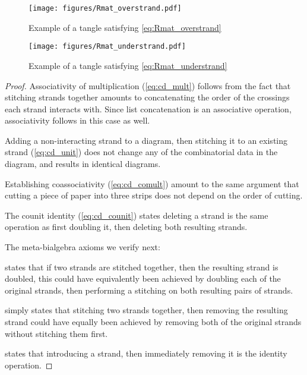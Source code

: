 \begin{figure}[h]
        \centering
        \texttt{[image: figures/Rmat\_overstrand.pdf]}
        \caption{Example of a tangle satisfying \cref{eq:Rmat_overstrand}}
        \label{fig:Rmat_overstrand}
\end{figure}
\begin{figure}[h]
        \centering
        \texttt{[image: figures/Rmat\_understrand.pdf]}
        \caption{Example of a tangle satisfying \cref{eq:Rmat_understrand}}
        \label{fig:Rmat_understrand}
\end{figure}
\begin{proof}
        Associativity of multiplication (\cref{eq:cd_mult}) follows from the
        fact that stitching strands together amounts to concatenating the order
        of the crossings each strand interacts with. Since list concatenation is
        an associative operation, associativity follows in this case as well.

        Adding a non-interacting strand to a diagram, then stitching it to an
        existing strand (\cref{eq:cd_unit}) does not change any of the
        combinatorial data in the diagram, and results in identical diagrams.

        Establishing coassociativity (\cref{eq:cd_comult}) amount to the same
        argument that cutting a piece of paper into three strips does not depend
        on the order of cutting.

        The counit identity (\cref{eq:cd_counit}) states deleting a strand
        is the same operation as first doubling it, then deleting both resulting
        strands.

        The meta-bialgebra axioms we verify next:

         states that if two strands are stitched
        together, then the resulting strand is doubled, this could have
        equivalently been achieved by doubling each of the original strands,
        then performing a stitching on both resulting pairs of strands.

         simply states that stitching two strands
        together, then removing the resulting strand could have equally been
        achieved by removing both of the original strands without stitching them
        first.

         states that introducing a strand, then
        immediately removing it is the identity operation.


\end{proof}
